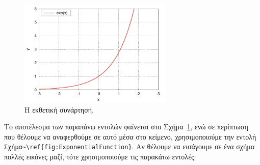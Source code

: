 \begin{figure}[t]
	\centering
	\includegraphics[width=0.65\textwidth]{Figures/ExponentialFunction.pdf}
	\caption{Η εκθετική συνάρτηση.}
	\label{fig:ExponentialFunction}
\end{figure}

Το αποτέλεσμα των παραπάνω εντολών φαίνεται στο Σχήμα~\ref{fig:ExponentialFunction}, ενώ σε περίπτωση που θέλουμε να αναφερθούμε σε αυτό μέσα στο κείμενο, χρησιμοποιούμε την εντολή \verb|Σχήμα~\ref{fig:ExponentialFunction}|.
Αν θέλουμε να εισάγουμε σε ένα σχήμα πολλές εικόνες μαζί, τότε χρησιμοποιούμε τις παρακάτω εντολές:


